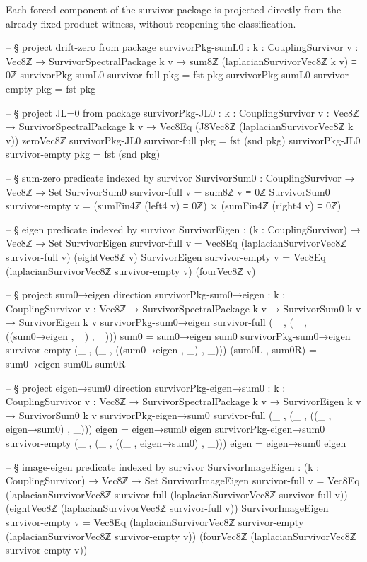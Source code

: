 \documentclass[11pt,a4paper]{book}
\begin{document}
Each forced component of the survivor package is projected directly from the already-fixed product witness, without reopening the classification.

\begin{code}
-- § project drift-zero from package
survivorPkg-sumL0 : {k : CouplingSurvivor} {v : Vec8ℤ} →
  SurvivorSpectralPackage k v → sum8ℤ (laplacianSurvivorVec8ℤ k v) ≡ 0ℤ
survivorPkg-sumL0 {survivor-full} pkg = fst pkg
survivorPkg-sumL0 {survivor-empty} pkg = fst pkg

-- § project JL=0 from package
survivorPkg-JL0 : {k : CouplingSurvivor} {v : Vec8ℤ} →
  SurvivorSpectralPackage k v → Vec8Eq (J8Vec8ℤ (laplacianSurvivorVec8ℤ k v)) zeroVec8ℤ
survivorPkg-JL0 {survivor-full} pkg = fst (snd pkg)
survivorPkg-JL0 {survivor-empty} pkg = fst (snd pkg)

-- § sum-zero predicate indexed by survivor
SurvivorSum0 : CouplingSurvivor → Vec8ℤ → Set
SurvivorSum0 survivor-full v = sum8ℤ v ≡ 0ℤ
SurvivorSum0 survivor-empty v = (sumFin4ℤ (left4 v) ≡ 0ℤ) × (sumFin4ℤ (right4 v) ≡ 0ℤ)

-- § eigen predicate indexed by survivor
SurvivorEigen : (k : CouplingSurvivor) → Vec8ℤ → Set
SurvivorEigen survivor-full v =
  Vec8Eq (laplacianSurvivorVec8ℤ survivor-full v) (eightVec8ℤ v)
SurvivorEigen survivor-empty v =
  Vec8Eq (laplacianSurvivorVec8ℤ survivor-empty v) (fourVec8ℤ v)

-- § project sum0→eigen direction
survivorPkg-sum0→eigen : {k : CouplingSurvivor} {v : Vec8ℤ} →
  SurvivorSpectralPackage k v → SurvivorSum0 k v → SurvivorEigen k v
survivorPkg-sum0→eigen {survivor-full} (_ , (_ , ((sum0→eigen , _) , _))) sum0 = sum0→eigen sum0
survivorPkg-sum0→eigen {survivor-empty} (_ , (_ , ((sum0→eigen , _) , _))) (sum0L , sum0R) = sum0→eigen sum0L sum0R

-- § project eigen→sum0 direction
survivorPkg-eigen→sum0 : {k : CouplingSurvivor} {v : Vec8ℤ} →
  SurvivorSpectralPackage k v → SurvivorEigen k v → SurvivorSum0 k v
survivorPkg-eigen→sum0 {survivor-full} (_ , (_ , ((_ , eigen→sum0) , _))) eigen = eigen→sum0 eigen
survivorPkg-eigen→sum0 {survivor-empty} (_ , (_ , ((_ , eigen→sum0) , _))) eigen = eigen→sum0 eigen

-- § image-eigen predicate indexed by survivor
SurvivorImageEigen : (k : CouplingSurvivor) → Vec8ℤ → Set
SurvivorImageEigen survivor-full v =
  Vec8Eq (laplacianSurvivorVec8ℤ survivor-full (laplacianSurvivorVec8ℤ survivor-full v))
        (eightVec8ℤ (laplacianSurvivorVec8ℤ survivor-full v))
SurvivorImageEigen survivor-empty v =
  Vec8Eq (laplacianSurvivorVec8ℤ survivor-empty (laplacianSurvivorVec8ℤ survivor-empty v))
        (fourVec8ℤ (laplacianSurvivorVec8ℤ survivor-empty v))


\end{code}
\end{document}
